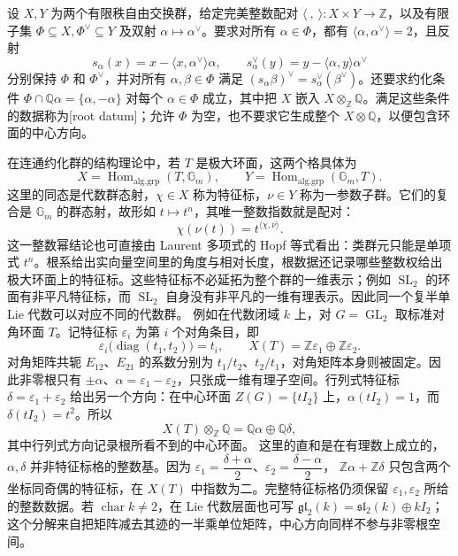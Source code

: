 \begin{definition}\label{b5:def:root-datum}
	设 \(X,Y\) 为两个有限秩自由交换群，给定完美整数配对 \(\langle\ ,\ \rangle:X\times Y\to\mathbb Z\)，以及有限子集 \(\Phi\subseteq X,\Phi^\vee\subseteq Y\) 及双射 \(\alpha\mapsto\alpha^\vee\)。要求对所有 \(\alpha\in\Phi\)，都有 \(\langle\alpha,\alpha^\vee\rangle=2\)，且反射
	\[
		s_\alpha(x)=x-\langle x,\alpha^\vee\rangle\alpha,\qquad s_\alpha^\vee(y)=y-\langle\alpha,y\rangle\alpha^\vee
	\]
	分别保持 \(\Phi\) 和 \(\Phi^\vee\)，并对所有 \(\alpha,\beta\in\Phi\) 满足 \((s_\alpha\beta)^\vee=s_\alpha^\vee(\beta^\vee)\)。还要求约化条件 \(\Phi\cap\mathbb Q\alpha=\{\alpha,-\alpha\}\) 对每个 \(\alpha\in\Phi\) 成立，其中把 \(X\) 嵌入 \(X\otimes_{\mathbb Z}\mathbb Q\)。满足这些条件的数据称为[root datum]；允许 \(\Phi\) 为空，也不要求它生成整个 \(X\otimes\mathbb Q\)，以便包含环面的中心方向。
\end{definition}
在连通约化群的结构理论中，若 \(T\) 是极大环面，这两个格具体为
\[
	X=\operatorname{Hom}_{\mathrm{alg.grp}}(T,\mathbb G_m),\qquad Y=\operatorname{Hom}_{\mathrm{alg.grp}}(\mathbb G_m,T).
\]
这里的同态是代数群态射，\(\chi\in X\) 称为特征标，\(\nu\in Y\) 称为一参数子群。它们的复合是 \(\mathbb G_m\) 的群态射，故形如 \(t\mapsto t^n\)，其唯一整数指数就是配对：
\[
	\chi(\nu(t))=t^{\langle\chi,\nu\rangle}.
\]
这一整数幂结论也可直接由 Laurent 多项式的 Hopf 等式看出：类群元只能是单项式 \(t^n\)。根系给出实向量空间里的角度与相对长度，根数据还记录哪些整数权给出极大环面上的特征标。这些特征标不必延拓为整个群的一维表示；例如 \(\operatorname{SL}_2\) 的环面有非平凡特征标，而 \(\operatorname{SL}_2\) 自身没有非平凡的一维有理表示。因此同一个复半单 Lie 代数可以对应不同的代数群。
\ProseParagraphBreak
例如在代数闭域 \(k\) 上，对 \(G=\operatorname{GL}_2\) 取标准对角环面 \(T\)。记特征标 \(\varepsilon_i\) 为第 \(i\) 个对角条目，即
\[
	\varepsilon_i\bigl(\operatorname{diag}(t_1,t_2)\bigr)=t_i, \qquad X(T)=\mathbb Z\varepsilon_1\oplus\mathbb Z\varepsilon_2.
\]
对角矩阵共轭 \(E_{12}\)、\(E_{21}\) 的系数分别为 \(t_1/t_2\)、\(t_2/t_1\)，对角矩阵本身则被固定。因此非零根只有 \(\pm\alpha\)、\(\alpha=\varepsilon_1-\varepsilon_2\)，只张成一维有理子空间。行列式特征标 \(\delta=\varepsilon_1+\varepsilon_2\) 给出另一个方向：在中心环面 \(Z(G)=\{tI_2\}\) 上，\(\alpha(tI_2)=1\)，而 \(\delta(tI_2)=t^2\)。所以
\[
	X(T)\otimes_{\mathbb Z}\mathbb Q =\mathbb Q\alpha\oplus\mathbb Q\delta,
\]
其中行列式方向记录根所看不到的中心环面。
\ProseParagraphBreak
这里的直和是在有理数上成立的，\(\alpha,\delta\) 并非特征标格的整数基。因为 \(\varepsilon_1=\dfrac{\delta+\alpha}{2}\)、\(\varepsilon_2=\dfrac{\delta-\alpha}{2}\)， \(\mathbb Z\alpha+\mathbb Z\delta\) 只包含两个坐标同奇偶的特征标，在 \(X(T)\) 中指数为二。完整特征标格仍须保留 \(\varepsilon_1,\varepsilon_2\) 所给的整数数据。若 \(\operatorname{char}k\ne2\)，在 Lie 代数层面也可写 \(\mathfrak{gl}_2(k)=\mathfrak{sl}_2(k)\oplus kI_2\)；这个分解来自把矩阵减去其迹的一半乘单位矩阵，中心方向同样不参与非零根空间。
